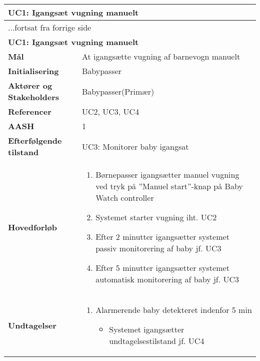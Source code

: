 \begin{center} \centering \label{kravspec:uc1}
	\begin{longtable}{|p{5cm}|p{9cm}|}  %
	\hline
		\multicolumn{2}{|l|}{\textbf{UC1: Igangsæt vugning manuelt}} \\\hline %
		\endfirsthead
		
		\multicolumn{2}{l}{...fortsat fra forrige side} \\ \hline %
		\multicolumn{2}{|l|}{\textbf{UC1: Igangsæt vugning manuelt}} \\\hline %
		\endhead	
		
		\textbf{Mål}							&At igangsætte vugning af barnevogn manuelt 		\\\hline
		\textbf{Initialisering}				&Babypasser		\\\hline
		\textbf{Aktører og Stakeholders}		&Babypasser(Primær)		\\\hline 
		\textbf{Referencer}					&UC2, UC3, UC4		\\\hline
		\textbf{AASH}						&1		\\\hline
		\textbf{Efterfølgende tilstand}		&UC3: Monitorer baby igangsat		\\\hline
		\textbf{Hovedforløb}					
			&\begin{enumerate}
	
				\item Børnepasser igangsætter manuel vugning ved tryk på ''Manuel start''-knap på Baby Watch controller
				
				\item \label{kravspec:uc1_vugning}Systemet starter vugning iht. UC2
				
				\item \label{kravspec:uc1_timeout2}Efter 2 minutter igangsætter systemet passiv monitorering af baby jf. UC3			
								
				\item \label{kravspec:uc1_timeout5}Efter 5 minutter igangsætter systemet automatisk monitorering af baby jf. UC3	
				\newline [Und: \ref{kravspec:uc1_timeout5}.a Alarmerende baby detekteret indenfor 5 min]				
				
			\end{enumerate}
		\\\hline
		\textbf{Undtagelser}
			&\begin{enumerate}[label=\ref{kravspec:uc1_vugning}.a]
			\item Alarmerende baby detekteret indenfor 5 min
					\begin{itemize}
					
					\item Systemet igangsætter undtagelsestilstand jf. UC4
					
					\end{itemize}
			\end{enumerate}
			
		\\\hline
	\end{longtable} 
\end{center}

